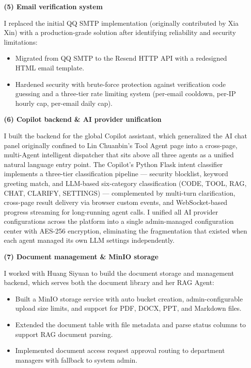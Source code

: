 \textbf{(5) Email verification system}

I replaced the initial QQ SMTP implementation (originally contributed by Xia Xin) with a production-grade solution after identifying reliability and security limitations:

\begin{itemize}
  \item Migrated from QQ SMTP to the Resend HTTP API with a redesigned HTML email template.
  \item Hardened security with brute-force protection against verification code guessing and a three-tier rate limiting system (per-email cooldown, per-IP hourly cap, per-email daily cap).
\end{itemize}

\textbf{(6) Copilot backend \& AI provider unification}

I built the backend for the global Copilot assistant, which generalized the AI chat panel originally confined to Lin Chuanbin's Tool Agent page into a cross-page, multi-Agent intelligent dispatcher that sits above all three agents as a unified natural language entry point. The Copilot's Python Flask intent classifier implements a three-tier classification pipeline --- security blocklist, keyword greeting match, and LLM-based six-category classification (CODE, TOOL, RAG, CHAT, CLARIFY, SETTINGS) --- complemented by multi-turn clarification, cross-page result delivery via browser custom events, and WebSocket-based progress streaming for long-running agent calls. I unified all AI provider configurations across the platform into a single admin-managed configuration center with AES-256 encryption, eliminating the fragmentation that existed when each agent managed its own LLM settings independently.

\textbf{(7) Document management \& MinIO storage}

I worked with Huang Siyuan to build the document storage and management backend, which serves both the document library and her RAG Agent:

\begin{itemize}
  \item Built a MinIO storage service with auto bucket creation, admin-configurable upload size limits, and support for PDF, DOCX, PPT, and Markdown files.
  \item Extended the document table with file metadata and parse status columns to support RAG document parsing.
  \item Implemented document access request approval routing to department managers with fallback to system admin.
\end{itemize}

